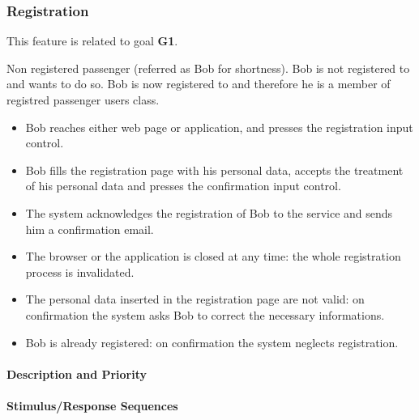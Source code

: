 \subsubsection{Registration}
This feature is related to goal \textbf{G1}.
\begin{itemize}
	 Non registered passenger (referred as Bob for shortness).
	 Bob is not registered to \myTaxiService{} and wants to do so.
	 Bob is now registered to \myTaxiService{} and therefore he is a member of registred passenger users class.
	\begin{itemize}
		\item Bob reaches either \myTaxiService{} web page or application, and presses the registration input control.
		\item Bob fills the registration page with his personal data, accepts the treatment of his personal data and presses the confirmation input control.
		\item The system acknowledges the registration of Bob to the service and sends him a confirmation email.
	\end{itemize}
	\begin{itemize}
		\item The browser or the application is closed at any time: the whole registration process is invalidated.
		\item The personal data inserted in the registration page are not valid: on confirmation the system asks Bob to correct the necessary informations.
		\item Bob is already registered: on confirmation the system neglects registration.
	\end{itemize}
\end{itemize}
\paragraph{Description and Priority}
\paragraph{Stimulus/Response Sequences}
